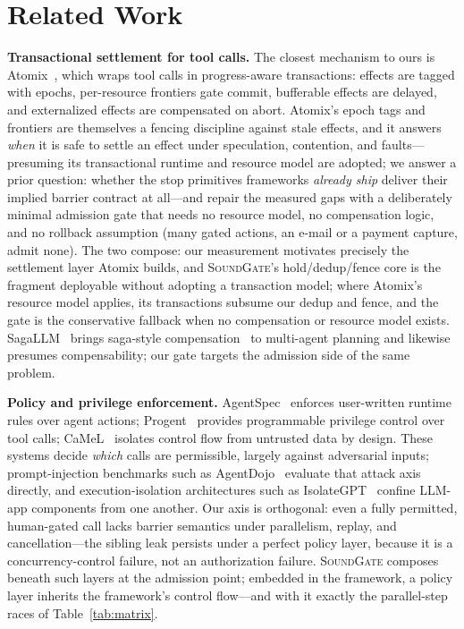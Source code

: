 \documentclass[10pt,journal,compsoc]{IEEEtran}
\newcommand{\sys}{\textsc{SoundGate}}
\begin{document}
\section{Related Work}
\label{sec:related}
\textbf{Transactional settlement for tool calls.} The closest mechanism to
ours is Atomix~\cite{atomix26}, which wraps tool calls in progress-aware
transactions: effects are tagged with epochs, per-resource frontiers gate
commit, bufferable effects are delayed, and externalized effects are
compensated on abort. Atomix's epoch tags and frontiers are themselves a
fencing discipline against stale effects, and it answers \emph{when} it is
safe to settle an effect under speculation, contention, and
faults---presuming its transactional runtime and resource model are adopted;
we answer a prior question:
whether the stop primitives frameworks \emph{already ship} deliver their
implied barrier contract at all---and repair the measured gaps with a
deliberately minimal admission gate that needs no resource model, no
compensation logic, and no rollback assumption (many gated actions, an e-mail
or a payment capture, admit none). The two compose: our measurement motivates
precisely the settlement layer Atomix builds, and \sys{}'s
hold/dedup/fence core is the fragment deployable without adopting a
transaction model; where Atomix's resource model applies, its transactions
subsume our dedup and fence, and the gate is the conservative fallback when no
compensation or resource model exists. SagaLLM~\cite{sagallm25} brings saga-style
compensation~\cite{sagas87} to multi-agent planning and likewise presumes
compensability; our gate targets the admission side of the same problem.

\textbf{Policy and privilege enforcement.} AgentSpec~\cite{agentspec25}
enforces user-written runtime rules over agent actions; Progent~\cite{progent25}
provides programmable privilege control over tool calls;
CaMeL~\cite{camel25} isolates control flow from untrusted data by design.
These systems decide \emph{which} calls are permissible, largely against
adversarial inputs; prompt-injection benchmarks such as
AgentDojo~\cite{agentdojo24} evaluate that attack axis directly, and
execution-isolation architectures such as IsolateGPT~\cite{isolategpt25}
confine LLM-app components from one another. Our axis is orthogonal: even a
fully permitted,
human-gated call lacks barrier semantics under parallelism, replay, and
cancellation---the sibling leak persists under a perfect policy layer, because
it is a concurrency-control failure, not an authorization failure. \sys{}
composes beneath such layers at the admission point; embedded in the
framework, a policy layer inherits the framework's control flow---and with it
exactly the parallel-step races of Table~\ref{tab:matrix}.
\end{document}
